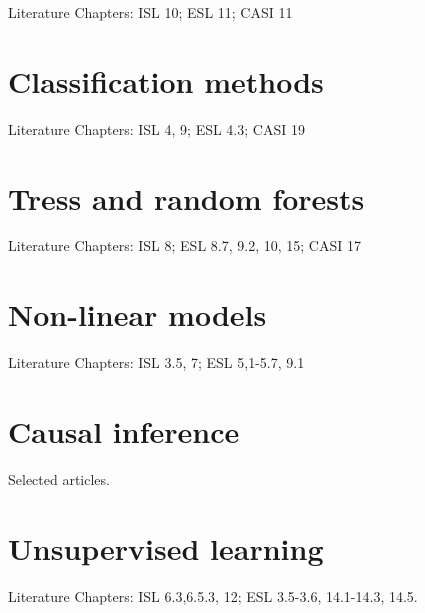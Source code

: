 \documentclass[11pt,a4paper]{article}
\begin{document}
Literature Chapters: ISL 10; ESL 11; CASI 11

\section{Classification methods}

Literature Chapters: ISL 4, 9; ESL 4.3; CASI 19

\section{Tress and random forests}

Literature Chapters: ISL 8; ESL 8.7, 9.2, 10, 15; CASI 17

\section{Non-linear models}

Literature Chapters: ISL 3.5, 7; ESL 5,1-5.7, 9.1

\section{Causal inference}

Selected articles.


\section{Unsupervised learning}

Literature Chapters: ISL 6.3,6.5.3, 12; ESL 3.5-3.6, 14.1-14.3, 14.5.
\end{document}
